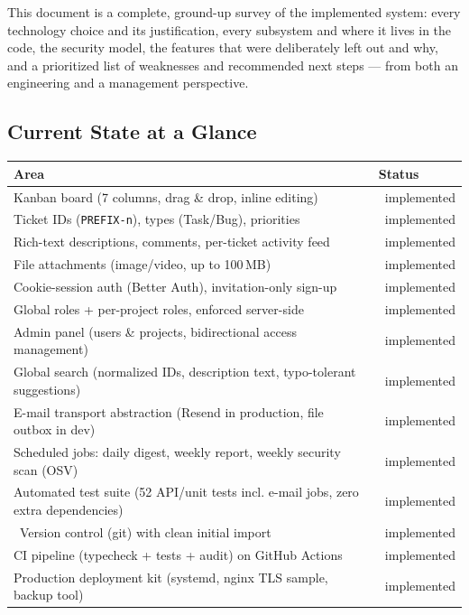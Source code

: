 \documentclass[11pt,a4paper]{article}
\newcommand{\ok}{\textcolor{okgreen}{\ding{51}}}
\begin{document}
This document is a complete, ground-up survey of the implemented system: every
technology choice and its justification, every subsystem and where it lives in
the code, the security model, the features that were deliberately left out and
why, and a prioritized list of weaknesses and recommended next steps --- from
both an engineering and a management perspective.

\subsection{Current State at a Glance}

\begin{table}[H]
\centering
\small
\begin{tabularx}{\textwidth}{p{4.4cm}X}
\toprule
\textbf{Area} & \textbf{Status}\\
\midrule
Kanban board (7 columns, drag \& drop, inline editing) & \ok~implemented \\
Ticket IDs (\texttt{PREFIX-n}), types (Task/Bug), priorities & \ok~implemented \\
Rich-text descriptions, comments, per-ticket activity feed & \ok~implemented \\
File attachments (image/video, up to 100\,MB) & \ok~implemented \\
Cookie-session auth (Better Auth), invitation-only sign-up & \ok~implemented \\
Global roles + per-project roles, enforced server-side & \ok~implemented \\
Admin panel (users \& projects, bidirectional access management) & \ok~implemented \\
Global search (normalized IDs, description text, typo-tolerant suggestions) & \ok~implemented \\
E-mail transport abstraction (Resend in production, file outbox in dev) & \ok~implemented \\
Scheduled jobs: daily digest, weekly report, weekly security scan (OSV) & \ok~implemented \\
Automated test suite (52 API/unit tests incl. e-mail jobs, zero extra dependencies) & \ok~implemented \\\
Version control (git) with clean initial import & \ok~implemented \\
CI pipeline (typecheck + tests + audit) on GitHub Actions & \ok~implemented \\
Production deployment kit (systemd, nginx TLS sample, backup tool) & \ok~implemented \\

\end{tabularx}
\end{table}
\end{document}
